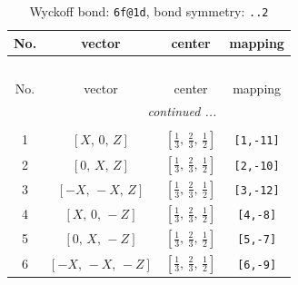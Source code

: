 \documentclass[fleqn,8pt]{jsarticle}
\begin{document}
\begin{longtable}{cccc}
\caption{Wyckoff bond: {\tt 6f@1d}, bond symmetry: {\tt ..2}}
 \\
 \hline \hline
No. & vector & center & mapping \\ \hline \endfirsthead

\multicolumn{3}{l}{\tablename\ \thetable{}} \\
 \hline \hline
No. & vector & center & mapping \\ \hline \endhead

 \hline \hline
\multicolumn{3}{r}{\footnotesize\it continued ...} \\ \endfoot

 \hline \hline
\multicolumn{3}{r}{} \\ \endlastfoot

1 & $\left[ X,\, 0,\, Z \right]$ & $\left[ \frac{1}{3},\, \frac{2}{3},\, \frac{1}{2} \right]$ & {\tt [1,-11]} \\ \hline
2 & $\left[ 0,\, X,\, Z \right]$ & $\left[ \frac{1}{3},\, \frac{2}{3},\, \frac{1}{2} \right]$ & {\tt [2,-10]} \\ \hline
3 & $\left[ - X,\, - X,\, Z \right]$ & $\left[ \frac{1}{3},\, \frac{2}{3},\, \frac{1}{2} \right]$ & {\tt [3,-12]} \\ \hline
4 & $\left[ X,\, 0,\, - Z \right]$ & $\left[ \frac{1}{3},\, \frac{2}{3},\, \frac{1}{2} \right]$ & {\tt [4,-8]} \\ \hline
5 & $\left[ 0,\, X,\, - Z \right]$ & $\left[ \frac{1}{3},\, \frac{2}{3},\, \frac{1}{2} \right]$ & {\tt [5,-7]} \\ \hline
6 & $\left[ - X,\, - X,\, - Z \right]$ & $\left[ \frac{1}{3},\, \frac{2}{3},\, \frac{1}{2} \right]$ & {\tt [6,-9]} \\
\end{longtable}
\renewcommand{\arraystretch}{1.2}
\end{document}

